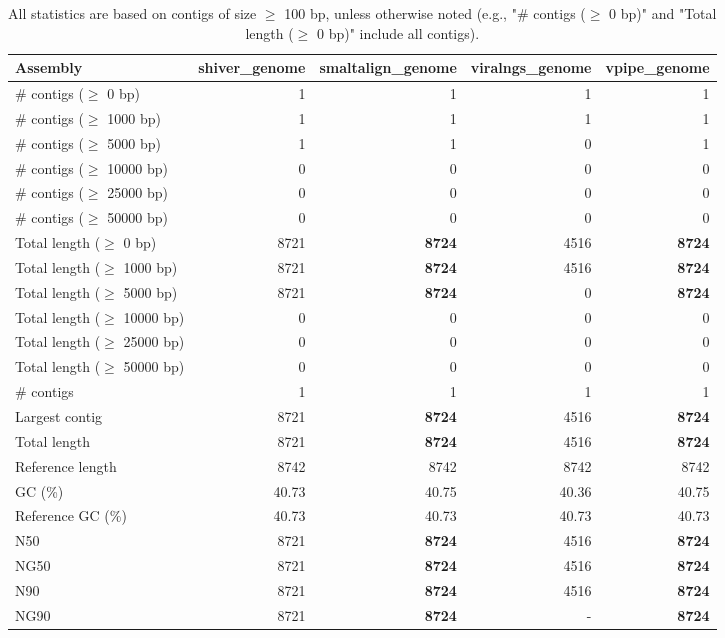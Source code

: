 \documentclass[12pt,a4paper]{article}
\begin{document}
\begin{table}[ht]
\begin{center}
\caption{All statistics are based on contigs of size $\geq$ 100 bp, unless otherwise noted (e.g., "\# contigs ($\geq$ 0 bp)" and "Total length ($\geq$ 0 bp)" include all contigs).}
\begin{tabular}{|l*{4}{|r}|}
\hline
Assembly & shiver\_genome & smaltalign\_genome & viralngs\_genome & vpipe\_genome \\ \hline
\# contigs ($\geq$ 0 bp) & 1 & 1 & 1 & 1 \\ \hline
\# contigs ($\geq$ 1000 bp) & 1 & 1 & 1 & 1 \\ \hline
\# contigs ($\geq$ 5000 bp) & 1 & 1 & 0 & 1 \\ \hline
\# contigs ($\geq$ 10000 bp) & 0 & 0 & 0 & 0 \\ \hline
\# contigs ($\geq$ 25000 bp) & 0 & 0 & 0 & 0 \\ \hline
\# contigs ($\geq$ 50000 bp) & 0 & 0 & 0 & 0 \\ \hline
Total length ($\geq$ 0 bp) & 8721 & {\bf 8724} & 4516 & {\bf 8724} \\ \hline
Total length ($\geq$ 1000 bp) & 8721 & {\bf 8724} & 4516 & {\bf 8724} \\ \hline
Total length ($\geq$ 5000 bp) & 8721 & {\bf 8724} & 0 & {\bf 8724} \\ \hline
Total length ($\geq$ 10000 bp) & 0 & 0 & 0 & 0 \\ \hline
Total length ($\geq$ 25000 bp) & 0 & 0 & 0 & 0 \\ \hline
Total length ($\geq$ 50000 bp) & 0 & 0 & 0 & 0 \\ \hline
\# contigs & 1 & 1 & 1 & 1 \\ \hline
Largest contig & 8721 & {\bf 8724} & 4516 & {\bf 8724} \\ \hline
Total length & 8721 & {\bf 8724} & 4516 & {\bf 8724} \\ \hline
Reference length & 8742 & 8742 & 8742 & 8742 \\ \hline
GC (\%) & 40.73 & 40.75 & 40.36 & 40.75 \\ \hline
Reference GC (\%) & 40.73 & 40.73 & 40.73 & 40.73 \\ \hline
N50 & 8721 & {\bf 8724} & 4516 & {\bf 8724} \\ \hline
NG50 & 8721 & {\bf 8724} & 4516 & {\bf 8724} \\ \hline
N90 & 8721 & {\bf 8724} & 4516 & {\bf 8724} \\ \hline
NG90 & 8721 & {\bf 8724} & - & {\bf 8724} \\ \hline

\end{tabular}
\end{center}
\end{table}
\end{document}
